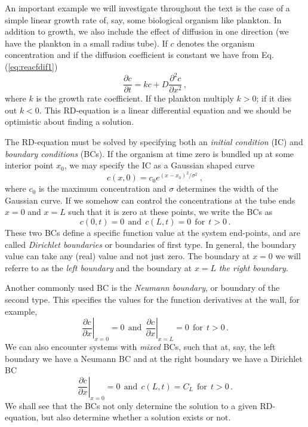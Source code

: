 \begin{example}
	\label{ex:simplegrowth}
	An important example we will investigate throughout the text is the case of 
	a simple linear growth rate of, say, some biological organism like plankton. 
	In addition to growth, we also include the effect of diffusion in one direction 
	(we have the plankton in a small radius tube). If $c$ denotes the 
	organism concentration and if the diffusion coefficient is constant we have from
	Eq. (\ref{eq:reacfdif1})
	\begin{equation}
		\label{eq:linrd}
		\frac{\partial c}{\partial t} = kc + D \frac{\partial^2 c}{\partial x^2} \, ,
	\end{equation}
	where $k$ is the growth rate coefficient. If the plankton multiply $k>0$; if it
	dies out $k<0$. This RD-equation is a linear differential equation and
	we should be optimistic about finding a solution.

	The RD-equation must be solved by specifying both an \emph{initial condition} (IC) and
	\emph{boundary conditions} (BCs). If the organism at time zero is bundled up at some
	interior point $x_0$, we may specify the IC as a Gaussian shaped curve 
	\begin{equation}
		c(x,0)=c_0 e^{(x-x_0)^2/\sigma^2} \ ,
	\end{equation}
	where $c_0$ is the maximum concentration and $\sigma$ determines the width of
	the Gaussian curve. If we somehow can control the concentrations at the tube
	ends $x=0$ and $x=L$ such that it is zero at these points, we write the BCs as
	\begin{equation}
		\label{eq:bcDiriclecht}
		c(0, t) = 0 \ \ \text{and} \ \ c(L,t) = 0 \ \ \text{for} \ \ t>0 \, . 
	\end{equation}
	These two BCs define a specific function value at the system end-points, and
	are called \emph{Dirichlet boundaries} or boundaries of first type. In general, the
	boundary value can take any (real) value and not just zero. The boundary at $x=0$ we 
	will referre to as the \emph{left boundary} and the boundary at $x=L$ 
	\emph{the right boundary}. 

	Another commonly used BC is the \emph{Neumann boundary}, or boundary of the second
	type. This specifies the values for the function derivatives at the wall, for
	example, 
	\begin{equation}
		\label{eq:bcNeumann}
		\left.\frac{\partial c}{\partial x}\right|_{x=0} = 0
		\ \ \text{and} \ \
		\left.\frac{\partial c}{\partial x}\right|_{x=L} = 0
		\ \ \text{for} \ \ t>0 \, . 
	\end{equation}
	We can also encounter systems with \emph{mixed} BCs, such that at, say, the left boundary we have
	a Neumann BC and at the right boundary we have a Dirichlet BC
	\begin{equation}
		\left.\frac{\partial c}{\partial x}\right|_{x=0} = 0
		\ \ \text{and} \ \
		c(L,t) = C_L  \ \ \text{for} \ \ t>0 \, .
	\end{equation}
	We shall see that the BCs not only determine the solution to a given
	RD-equation, but also determine whether a solution exists or not.
\end{example}


